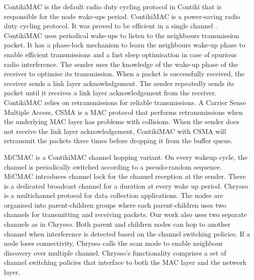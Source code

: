 ContikiMAC \cite{contikimac} is the default radio duty cycling protocol in Contiki that is responsible for the node wake-ups period. ContikiMAC is a power-saving radio duty cycling protocol. It was proved to be efficient in a single channel \cite{micmac}\cite{orpl}. ContikiMAC uses periodical wake-ups to listen to the neighbours transmission packet. It has a phase-lock mechanism to learn the neighbours wake-up phase to enable efficient transmissions and a fast sleep optimisation in case of spurious radio interference. The sender uses the knowledge of the wake-up phase of the receiver to optimise its transmission. When a packet is successfully received, the receiver sends a link layer acknowledgement. The sender repeatedly sends its packet until it receives a link layer acknowledgement from the receiver. ContikiMAC relies on retransmissions for reliable transmissions. A Carrier Sense Multiple Access, CSMA is a MAC protocol that performs retransmissions when the underlying MAC layer has problems with collisions. When the sender does not receive the link layer acknowledgement, ContikiMAC with CSMA will retransmit the packets three times before dropping it from the buffer queue.




MiCMAC \cite{micmac} is a ContikiMAC \cite{contikimac} channel hopping variant. On every wakeup cycle, the channel is periodically switched according to a pseudo-random sequence. MiCMAC introduces channel lock for the channel reception at the sender. There is a dedicated broadcast channel for a duration at every wake up period. %
Chrysso \cite{chrysso} is a multichannel protocol for data collection applications. The nodes are organised into parent-children groups where each parent-children uses two channels for transmitting and receiving packets. Our work also uses two separate channels as in Chrysso. Both parent and children nodes can hop to another channel when interference is detected based on the channel switching policies. If a node loses connectivity, Chrysso calls the scan mode to enable neighbour discovery over multiple channel. Chrysso’s functionality comprises a set of channel switching policies that interface to both the MAC layer and the network layer.

